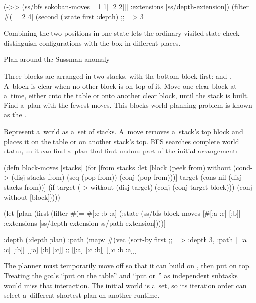 {(->> (ss/bfs sokoban-moves [[[1 1] [2 2]]]
                 {:extensions [ss/depth-extension]})
     (filter #(= [2 4] (second (:state %
     first
     :depth)
;; => 3
\endtt

Combining the two positions in one state lets the ordinary visited-state
check distinguish configurations with the box in different places.

\secc Plan around the Sussman anomaly

 Three blocks are arranged in two stacks, with the
bottom block first: \code{[:a :c]} and \code{[:b]}. A~block is clear when
no other block is on top of it. Move one clear block at a~time, either onto
the table or onto another clear block, until the stack
\code{[:c :b :a]} is built. Find a~plan with the fewest moves.
This blocks-world planning problem is known as the
.

\smallskip
{} Represent a~world as a~set of stacks. A~move
removes a~stack's top block and places it on the table or on another stack's
top. BFS searches complete world states, so it can find a~plan that first
undoes part of the initial arrangement:

\begtt {}
(defn block-moves [stacks]
  (for [from stacks
        :let [block (peek from)
              without (cond-> (disj stacks from)
                        (seq (pop from)) (conj (pop from)))]
        target (cons nil (disj stacks from))]
    (if target
      (-> without (disj target) (conj (conj target block)))
      (conj without [block]))))

(let [plan (first (filter #(= #{[:c :b :a]} (:state %
                          (ss/bfs block-moves [#{[:a :c] [:b]}]
                                      {:extensions [ss/depth-extension
                                                    ss/path-extension]})))]
  {:depth (:depth plan)
   :path (mapv #(vec (sort-by first %
;; => {:depth 3, :path [[[:a :c] [:b]] [[:a] [:b] [:c]]
;;                      [[:a] [:c :b]] [[:c :b :a]]]}
\endtt

The planner must temporarily move  off  so that it can
build  on , then put  on top. Treating the goals
“put  on the table” and “put  on ” as independent
subtasks would miss that interaction. The initial world is a~set, so its
iteration order can select a~different shortest plan on another runtime.

}}
